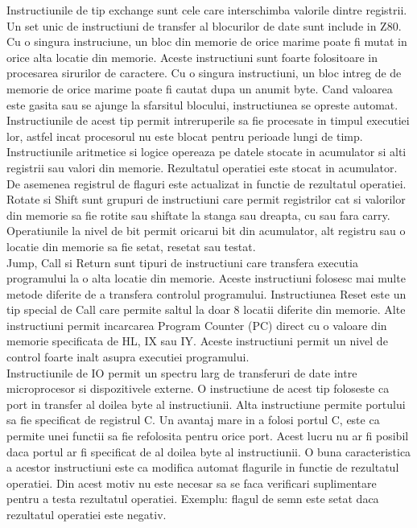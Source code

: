 \documentclass[titlepage,12pt]{article}
\begin{document}
Instructiunile de tip exchange sunt cele care interschimba valorile dintre registrii.\\

Un set unic de instructiuni de transfer al blocurilor de date sunt include in \ac {Z80}.
Cu o singura instruciune, un bloc din memorie de orice marime poate fi mutat in orice alta locatie din memorie.
Aceste instructiuni sunt foarte folositoare in procesarea sirurilor de caractere.
Cu o singura instructiuni, un bloc intreg de de memorie de orice marime poate fi cautat dupa un anumit byte.
Cand valoarea este gasita sau se ajunge la sfarsitul blocului, instructiunea se opreste automat.
Instructiunile de acest tip permit intreruperile sa fie procesate in timpul executiei lor, astfel incat procesorul nu este blocat pentru perioade lungi de timp.\\

Instructiunile aritmetice si logice opereaza pe datele stocate in acumulator si alti registrii sau valori din memorie.
Rezultatul operatiei este stocat in acumulator.
De asemenea registrul de flaguri este actualizat in functie de rezultatul operatiei.\\

Rotate si Shift sunt grupuri de instructiuni care permit registrilor cat si valorilor din memorie sa fie rotite sau shiftate la stanga sau dreapta, cu sau fara carry.\\

Operatiunile la nivel de bit permit oricarui bit din acumulator, alt registru sau o locatie din memorie sa fie setat, resetat sau testat.\\

Jump, Call si Return sunt tipuri de instructiuni care transfera executia programului la o alta locatie din memorie.
Aceste instructiuni folosesc mai multe metode diferite de a transfera controlul programului.
Instructiunea Reset este un tip special de Call care permite saltul la doar 8 locatii diferite din memorie.
Alte instructiuni permit incarcarea Program Counter (PC) direct cu o valoare din memorie specificata de HL, IX sau IY.
Aceste instructiuni permit un nivel de control foarte inalt asupra executiei programului.\\

Instructiunile de \ac {IO} permit un spectru larg de transferuri de date intre microprocesor si dispozitivele externe.
O instructiune de acest tip foloseste ca port in transfer al doilea byte al instructiunii.
Alta instructiune permite portului sa fie specificat de registrul C.
Un avantaj mare in a folosi portul C, este ca permite unei functii sa fie refolosita pentru orice port.
Acest lucru nu ar fi posibil daca portul ar fi specificat de al doilea byte al instructiunii.
O buna caracteristica a acestor instructiuni este ca modifica automat flagurile in functie de rezultatul operatiei.
Din acest motiv nu este necesar sa se faca verificari suplimentare pentru a testa rezultatul operatiei. Exemplu: flagul de semn este setat daca rezultatul operatiei este negativ.\\
\end{document}
